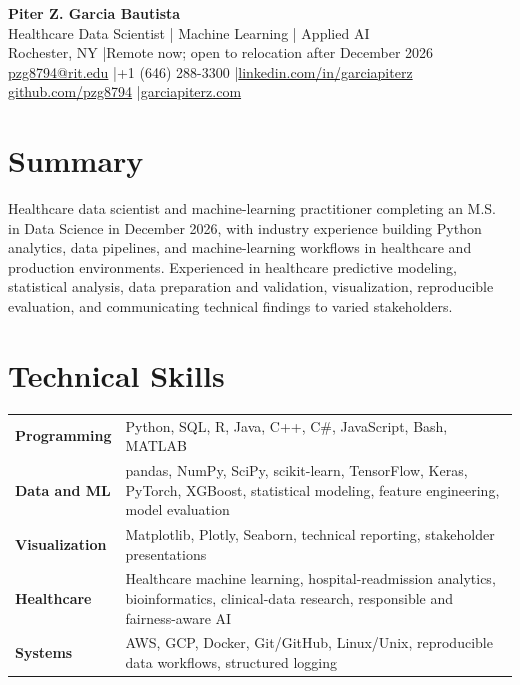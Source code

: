 \documentclass[10pt,letterpaper]{article}
\begin{document}
\fontsize{9}{10.4}\selectfont

\begin{center}
  {\Large\bfseries Piter Z. Garcia Bautista}\\[1pt]
  {\large Healthcare Data Scientist | Machine Learning | Applied AI}\\[2pt]
  Rochester, NY \enspace|\enspace Remote now; open to relocation after December 2026\\
  \href{mailto:pzg8794@rit.edu}{pzg8794@rit.edu}
  \enspace|\enspace +1 (646) 288-3300
  \enspace|\enspace \href{https://linkedin.com/in/garciapiterz}{linkedin.com/in/garciapiterz}\\
  \href{https://github.com/pzg8794}{github.com/pzg8794}
  \enspace|\enspace \href{https://garciapiterz.com}{garciapiterz.com}
\end{center}

\section*{Summary}
Healthcare data scientist and machine-learning practitioner completing an M.S.
in Data Science in December 2026, with industry experience building Python
analytics, data pipelines, and machine-learning workflows in healthcare and
production environments. Experienced in healthcare predictive modeling,
statistical analysis, data preparation and validation, visualization,
reproducible evaluation, and communicating technical findings to varied
stakeholders.

\section*{Technical Skills}
\begin{tabularx}{\textwidth}{@{}>{\bfseries}l X@{}}
Programming & Python, SQL, R, Java, C++, C\#, JavaScript, Bash, MATLAB\\
Data and ML & pandas, NumPy, SciPy, scikit-learn, TensorFlow, Keras, PyTorch, XGBoost, statistical modeling, feature engineering, model evaluation\\
Visualization & Matplotlib, Plotly, Seaborn, technical reporting, stakeholder presentations\\
Healthcare & Healthcare machine learning, hospital-readmission analytics, bioinformatics, clinical-data research, responsible and fairness-aware AI\\
Systems & AWS, GCP, Docker, Git/GitHub, Linux/Unix, reproducible data workflows, structured logging\\
\end{tabularx}
\end{document}
